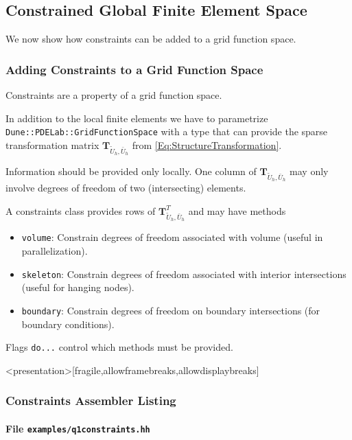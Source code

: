 \subsection{Constrained Global Finite Element Space}

We now show how constraints can be added to a grid function space.

\begin{frame}
\frametitle<presentation>{Adding Constraints to a Grid Function Space}
Constraints are a property of a grid function space.

In addition to the local finite elements we have to
parametrize \lstinline{Dune::PDELab::GridFunctionSpace} with a type
that can provide the sparse transformation matrix
$\mathbf{T}_{\tilde{U}_h,\bar{U}_h}$ from \eqref{Eq:StructureTransformation}. 

Information should be provided only locally. One
column of $\mathbf{T}_{\tilde{U}_h,\bar{U}_h}$ may only involve
degrees of freedom of two (intersecting) elements.

A constraints class provides rows of
$\mathbf{T}^T_{\tilde{U}_h,\bar{U}_h}$ and may have methods
\begin{itemize}
\item \lstinline{volume}: Constrain degrees of freedom associated with
volume (useful in parallelization).
\item \lstinline{skeleton}: Constrain degrees of freedom associated
with interior intersections (useful for hanging nodes).
\item \lstinline{boundary}: Constrain degrees of freedom on boundary
intersections (for boundary conditions).
\end{itemize}
Flags \lstinline{do...} control which methods must be provided.
\end{frame}

\begin{frame}<presentation>[fragile,allowframebreaks,allowdisplaybreaks]
\frametitle<presentation>{Constraints Assembler Listing}
\framesubtitle<presentation>{File \texttt{examples/q1constraints.hh}}

\end{frame}

